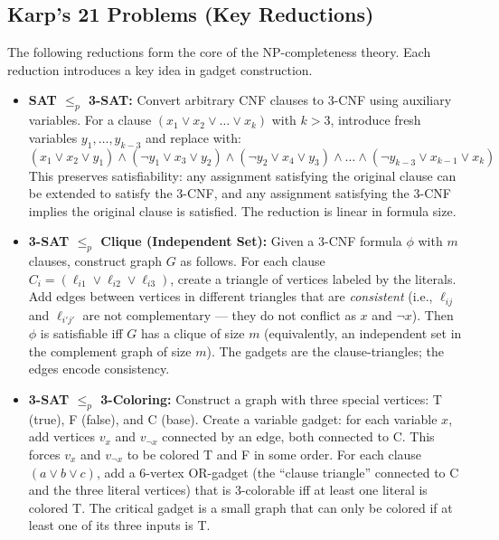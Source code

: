\subsection{Karp's 21 Problems (Key Reductions)}
\label{sec:np:karp}

The following reductions form the core of the NP-completeness theory. Each reduction introduces a key idea in gadget construction.

\begin{itemize}
\item \textbf{SAT $\le_p$ 3-SAT:} Convert arbitrary CNF clauses to 3-CNF using auxiliary variables. For a clause $(x_1 \lor x_2 \lor \dots \lor x_k)$ with $k > 3$, introduce fresh variables $y_1, \dots, y_{k-3}$ and replace with:
\[
(x_1 \lor x_2 \lor y_1) \land (\neg y_1 \lor x_3 \lor y_2) \land (\neg y_2 \lor x_4 \lor y_3) \land \dots \land (\neg y_{k-3} \lor x_{k-1} \lor x_k)
\]
This preserves satisfiability: any assignment satisfying the original clause can be extended to satisfy the 3-CNF, and any assignment satisfying the 3-CNF implies the original clause is satisfied. The reduction is linear in formula size.

\item \textbf{3-SAT $\le_p$ Clique (Independent Set):} Given a 3-CNF formula $\phi$ with $m$ clauses, construct graph $G$ as follows. For each clause $C_i = (\ell_{i1} \lor \ell_{i2} \lor \ell_{i3})$, create a triangle of vertices labeled by the literals. Add edges between vertices in different triangles that are \emph{consistent} (i.e., $\ell_{ij}$ and $\ell_{i'j'}$ are not complementary — they do not conflict as $x$ and $\neg x$). Then $\phi$ is satisfiable iff $G$ has a clique of size $m$ (equivalently, an independent set in the complement graph of size $m$). The gadgets are the clause-triangles; the edges encode consistency.

\item \textbf{3-SAT $\le_p$ 3-Coloring:} Construct a graph with three special vertices: T (true), F (false), and C (base). Create a variable gadget: for each variable $x$, add vertices $v_x$ and $v_{\neg x}$ connected by an edge, both connected to C. This forces $v_x$ and $v_{\neg x}$ to be colored T and F in some order. For each clause $(a \lor b \lor c)$, add a 6-vertex OR-gadget (the ``clause triangle'' connected to C and the three literal vertices) that is 3-colorable iff at least one literal is colored T. The critical gadget is a small graph that can only be colored if at least one of its three inputs is T.


\end{itemize}
